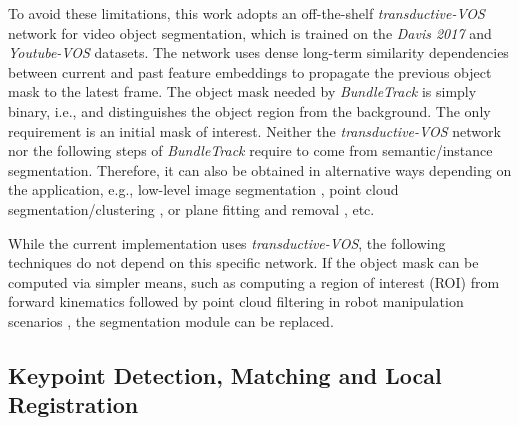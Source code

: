 \documentclass[letterpaper, 10 pt, conference]{ieeeconf}
\begin{document}
To avoid these limitations, this work adopts an off-the-shelf \textit{transductive-VOS} network \cite{zhang2020a} for video object segmentation, which is trained on the \textit{Davis 2017} \cite{pont20172017} and \textit{Youtube-VOS} \cite{xu2018youtube} datasets.  The network uses dense long-term similarity dependencies between current and past feature embeddings to propagate the previous object mask to the latest frame. The object mask needed by \textit{BundleTrack} is simply binary, i.e.,  and distinguishes the object region from the background.  The only requirement is an initial mask  of interest. Neither the \textit{transductive-VOS} network nor the following steps of \textit{BundleTrack} require  to come from semantic/instance segmentation. Therefore, it can also be obtained in  alternative ways depending on the application, e.g., low-level image segmentation \cite{meyer1992color,lafferty2001conditional}, point cloud segmentation/clustering \cite{rusu20113d,Papon13CVPR}, or plane fitting and removal \cite{rusu20113d}, etc.  






While the current implementation uses \textit{transductive-VOS}, the following techniques do not depend on this specific network. If the object mask can be computed via simpler means, such as computing a region of interest (ROI) from forward kinematics followed by point cloud filtering in robot manipulation scenarios \cite{wen2020robust}, the segmentation module can be replaced.

\vspace{-0.05in}
\subsection{Keypoint Detection, Matching and Local Registration} 
\label{sec:local_registration}
\vspace{-0.05in}
\end{document}
